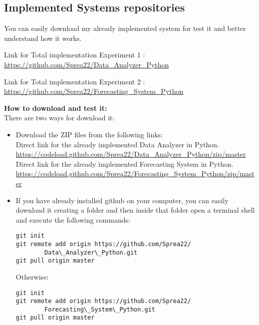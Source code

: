 


\hypersetup{
    colorlinks=true,
    linkcolor=blue,
    filecolor=magenta,      
    urlcolor=blue,
}

\subsection{Implemented Systems repositories}
You can easily download my already implemented system for test it and better understand how it works.

Link for Total implementation Experiment 1 : \\
\url{https://github.com/Sprea22/Data_Analyzer_Python}

Link for Total implementation Experiment 2 : \\
\url{https://github.com/Sprea22/Forecasting_System_Python}

\textbf{How to download and test it:}\\
There are two ways for download it:
\begin{itemize}
\item Download the ZIP files from the following links:\\

Direct link for the already implemented Data Analyzer in Python.\\
\url{https://codeload.github.com/Sprea22/Data_Analyzer_Python/zip/master}\\

Direct link for the already implemented Forecasting System in Python.\\
\url{https://codeload.github.com/Sprea22/Forecasting_System_Python/zip/master}

\newpage
\item If you have already installed github on your computer, you can easily download it creating a folder and then inside that folder open a terminal shell and execute the following commands:\\
\begin{lstlisting}
git init
git remote add origin https://github.com/Sprea22/
		Data\_Analyzer\_Python.git
git pull origin master
\end{lstlisting}

Otherwise:\\

\begin{lstlisting}
git init
git remote add origin https://github.com/Sprea22/
		Forecasting\_System\_Python.git
git pull origin master
\end{lstlisting}
\end{itemize}

